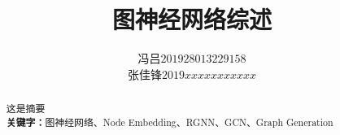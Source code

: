 \documentclass{ctexart}
\title{图神经网络综述}
\author{\begin{tabular}{ll}冯吕 & $201928013229158$\\
	张佳锋 & $2019xxxxxxxxxxx$
\end{tabular}}
\date{}
\begin{document}
\maketitle
{}
\begin{abstract}
 这是摘要\\

\centering
\textbf{关键字：}图神经网络、Node Embedding、RGNN、GCN、Graph Generation
\end{abstract}


\end{document}
